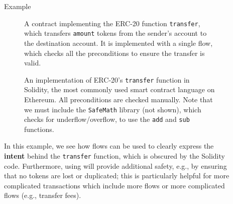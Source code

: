 \documentclass[usenames, dvipsnames, final]{beamer}
\newlength{\sepwidth}
\newlength{\colwidth}
\newcommand{\separatorcolumn}{\begin{column}{\sepwidth}\end{column}}
\begin{document}
\begin{frame}[t]
\begin{columns}[t]
\separatorcolumn

\begin{column}{\colwidth}

  \begin{block}{Example}
    \begin{figure}[h]
        \centering
        
        \caption{A \langName contract implementing the ERC-20 function \lstinline{transfer}, which transfers \lstinline{amount} tokens from the sender's account to the destination account.
            It is implemented with a single flow, which checks all the preconditions to ensure the transfer is valid.}
        \label{fig:erc20-transfer-flow}
    \end{figure}
    \begin{figure}[h]
        \centering
        
        \caption{An implementation of ERC-20's \lstinline{transfer} function in Solidity, the most commonly used smart contract language on Ethereum.
            All preconditions are checked manually.
            Note that we must include the \lstinline{SafeMath} library (not shown), which checks for underflow/overflow, to use the \lstinline{add} and \lstinline{sub} functions.}
        \label{fig:erc20-transfer-sol}
    \end{figure}

      In this example, we see how flows can be used to clearly express the \textbf{intent} behind the \lstinline{transfer} function, which is obscured by the Solidity code.
      Furthermore, using \langName will provide additional safety, e.g., by ensuring that no tokens are lost or duplicated; this is particularly helpful for more complicated transactions which include more flows or more complicated flows (e.g., transfer fees).
  \end{block}
\end{column}

\separatorcolumn


\end{columns}
\end{frame}
\end{document}
